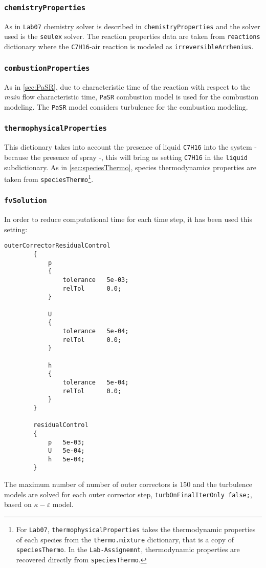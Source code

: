    \cprotect\subsubsection{\verb|chemistryProperties|}
    As in \verb|Lab07| chemistry solver is described in \verb|chemistryProperties| and the solver used is the \verb|seulex| solver. The reaction properties data are taken from \verb|reactions| dictionary where the \verb|C7H16|-air reaction is modeled as \verb|irreversibleArrhenius|. 

    \cprotect\subsubsection{\verb|combustionProperties|} 
    As in \ref{sec:PaSR}, due to characteristic time of the reaction with respect to the \textit{main} flow characteristic time, \verb|PaSR| combustion model is used for the combustion modeling. The \verb|PaSR| model considers turbulence for the combustion modeling. 

    \cprotect\subsubsection{\verb|thermophysicalProperties|}
    This dictionary takes into account the presence of liquid \verb|C7H16| into the system - because the presence of spray -, this will bring as setting \verb|C7H16| in the \verb|liquid| subdictionary. As in \ref{sec:speciesThermo}, species thermodynamics properties are taken from \verb|speciesThermo|\cprotect\footnote{For \verb|Lab07|, \verb|thermophysicalProperties| takes the thermodynamic properties of each species from the \verb|thermo.mixture| dictionary, that is a copy of \verb|speciesThermo|. In the \verb|Lab-Assignemnt|, thermodynamic properties are recovered directly from \verb|speciesThermo|.}.
    
    \cprotect\subsubsection{\verb|fvSolution|}
    In order to reduce computational time for each time step, it has been used this setting:
    \begin{lstlisting}[caption = $\mathtt{combustorReaction/system/fvSolution}$ convergence setting., label = list:convergence]
        outerCorrectorResidualControl
        {
            p
            {
                tolerance   5e-03;
                relTol      0.0;
            }

            U
            {
                tolerance   5e-04;
                relTol      0.0;
            }

            h
            {
                tolerance   5e-04;
                relTol      0.0;
            }
        }

        residualControl
        {
            p   5e-03;
            U   5e-04;
            h   5e-04;
        }
    \end{lstlisting}
    The maximum number of number of outer correctors is $150$ and the turbulence models are solved for each outer corrector step, \verb|turbOnFinalIterOnly false;|, based on $\kappa - \varepsilon$ model.

